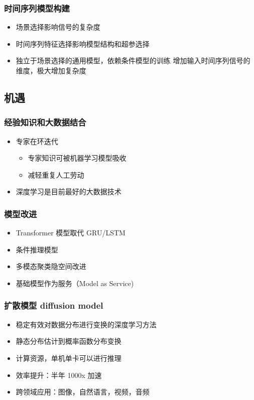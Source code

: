 \documentclass[a4paper, 11pt]{article}
\begin{document}
\subsubsection*{时间序列模型构建}
\label{sec:org0d2f9ed}
\begin{itemize}
\item 场景选择影响信号的复杂度
\item 时间序列特征选择影响模型结构和超参选择
\item 独立于场景选择的通用模型，依赖条件模型的训练
增加输入时间序列信号的维度，极大增加复杂度
\end{itemize}
\subsection*{机遇}
\label{sec:orgc13237c}
\subsubsection*{经验知识和大数据结合}
\label{sec:orgc047620}
\begin{itemize}
\item 专家在环迭代
\begin{itemize}
\item 专家知识可被机器学习模型吸收
\item 减轻重复人工劳动
\end{itemize}
\item 深度学习是目前最好的大数据技术
\end{itemize}
\subsubsection*{模型改进}
\label{sec:orgbc2840b}
\begin{itemize}
\item Transformer 模型取代 GRU/LSTM
\item 条件推理模型
\item 多模态聚类隐空间改进
\item 基础模型作为服务（Model as Service)
\end{itemize}
\subsubsection*{扩散模型 diffusion model}
\label{sec:orgf1054ba}
\begin{itemize}
\item 稳定有效对数据分布进行变换的深度学习方法
\item 静态分布估计到概率函数分布变换
\item 计算资源，单机单卡可以进行推理
\item 效率提升：半年 1000x 加速
\item 跨领域应用：图像，自然语言，视频，音频
\end{itemize}
\end{document}
